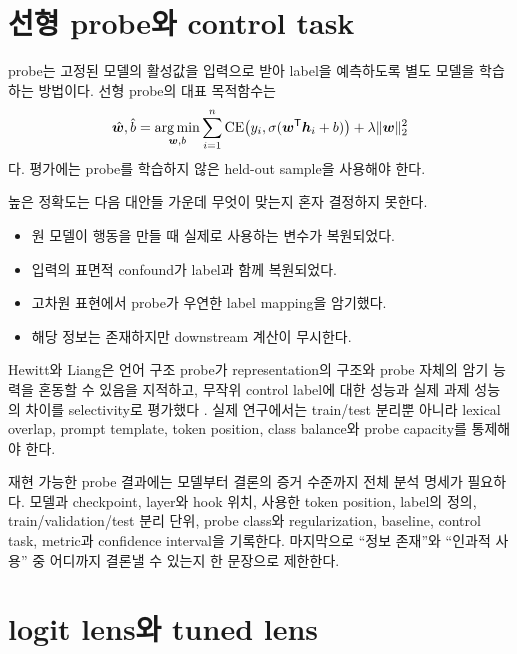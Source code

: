 \section{선형 probe와 control task}

probe는 고정된 모델의 활성값을 입력으로 받아 label을 예측하도록 별도 모델을 학습하는 방법이다.
선형 probe의 대표 목적함수는
\begin{equation}
  \hat{\bm{w}},\hat b
  =\operatorname*{arg\,min}_{\bm{w},b}
  \sum_{i=1}^{n}\operatorname{CE}
  \bigl(y_i,\sigma(\bm{w}^{\mathsf T}\bm{h}_i+b)\bigr)
  +\lambda\lVert\bm{w}\rVert_2^2
\end{equation}
다.
평가에는 probe를 학습하지 않은 held-out sample을 사용해야 한다.

높은 정확도는 다음 대안들 가운데 무엇이 맞는지 혼자 결정하지 못한다.

\begin{itemize}
  \item 원 모델이 행동을 만들 때 실제로 사용하는 변수가 복원되었다.
  \item 입력의 표면적 confound가 label과 함께 복원되었다.
  \item 고차원 표현에서 probe가 우연한 label mapping을 암기했다.
  \item 해당 정보는 존재하지만 downstream 계산이 무시한다.
\end{itemize}

Hewitt와 Liang은 언어 구조 probe가 representation의 구조와 probe 자체의 암기 능력을 혼동할 수 있음을 지적하고, 무작위 control label에 대한 성능과 실제 과제 성능의 차이를 selectivity로 평가했다 \citep{hewitt2019probes}.
실제 연구에서는 train/test 분리뿐 아니라 lexical overlap, prompt template, token position, class balance와 probe capacity를 통제해야 한다.

\begin{studybox}
재현 가능한 probe 결과에는 모델부터 결론의 증거 수준까지 전체 분석 명세가 필요하다.
모델과 checkpoint, layer와 hook 위치, 사용한 token position, label의 정의, train/validation/test 분리 단위, probe class와 regularization, baseline, control task, metric과 confidence interval을 기록한다.
마지막으로 ``정보 존재''와 ``인과적 사용'' 중 어디까지 결론낼 수 있는지 한 문장으로 제한한다.
\end{studybox}

\section{logit lens와 tuned lens}

